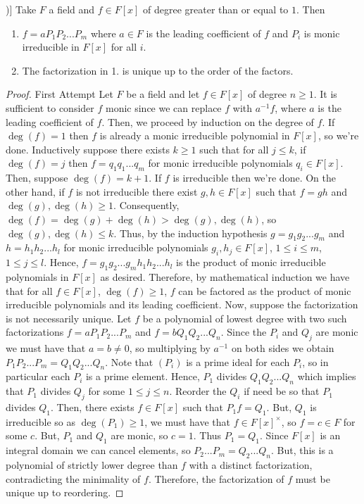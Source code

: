 \documentclass[12pt, a4paper, oneside, openright, titlepage]{book}
\begin{document}
\begin{namthm}[Unique Factorization Theorem (for F[x])]
    Take $F$ a field and $f \in F[x]$ of degree greater than or equal to $1$. Then \begin{enumerate}
        \item $f = aP_1P_2...P_m$ where $a \in F$ is the leading coefficient of $f$ and $P_i$ is monic irreducible in $F[x]$ for all $i$.
        \item The factorization in 1. is unique up to the order of the factors.
    \end{enumerate}
\end{namthm}
\begin{proof}{First Attempt}
    Let $F$ be a field and let $f \in F[x]$ of degree $n \geq 1$. It is sufficient to consider $f$ monic since we can replace $f$ with $a^{-1}f$, where $a$ is the leading coefficient of $f$. Then, we proceed by induction on the degree of $f$. If $\deg(f) = 1$ then $f$ is already a monic irreducible polynomial in $F[x]$, so we're done. Inductively suppose there exists $k \geq 1$ such that for all $j \leq k$, if $\deg(f) = j$ then $f = q_1q_1...q_m$ for monic irreducible polynomials $q_i \in F[x]$. Then, suppose $\deg(f) = k+1$. If $f$ is irreducible then we're done. On the other hand, if $f$ is not irreducible there exist $g,h \in F[x]$ such that $f = gh$ and $\deg(g),\deg(h) \geq 1$. Consequently, $\deg(f) = \deg(g)+\deg(h) > \deg(g),\deg(h)$, so $\deg(g),\deg(h) \leq k$. Thus, by the induction hypothesis $g = g_1g_2...g_m$ and $h = h_1h_2...h_l$ for monic irreducible polynomials $g_i,h_j \in F[x]$, $1\leq i \leq m$, $1 \leq j \leq l$. Hence, $f = g_1g_2...g_mh_1h_2...h_l$ is the product of monic irreducible polynomials in $F[x]$ as desired. Therefore, by mathematical induction we have that for all $f \in F[x]$, $\deg(f) \geq 1$, $f$ can be factored as the product of monic irreducible polynomials and its leading coefficient. Now, suppose the factorization is not necessarily unique. Let $f$ be a polynomial of lowest degree with two such factorizations $f = aP_1P_2...P_m$ and $f = bQ_1Q_2...Q_n$. Since the $P_i$ and $Q_j$ are monic we must have that $a = b \neq 0$, so multiplying by $a^{-1}$ on both sides we obtain $P_1P_2...P_m = Q_1Q_2...Q_n$. Note that $(P_i)$ is a prime ideal for each $P_i$, so in particular each $P_i$ is a prime element. Hence, $P_1$ divides $Q_1Q_2...Q_n$ which implies that $P_1$ divides $Q_j$ for some $1 \leq j \leq n$. Reorder the $Q_i$ if need be so that $P_1$ divides $Q_1$. Then, there exists $f \in F[x]$ such that $P_1f = Q_1$. But, $Q_1$ is irreducible so as $\deg(P_1) \geq 1$, we must have that $f \in F[x]^{\times}$, so $f = c \in F$ for some $c$. But, $P_1$ and $Q_1$ are monic, so $c = 1$. Thus $P_1 = Q_1$. Since $F[x]$ is an integral domain we can cancel elements, so $P_2...P_m = Q_2...Q_n$. But, this is a polynomial of strictly lower degree than $f$ with a distinct factorization, contradicting the minimality of $f$. Therefore, the factorization of $f$ must be unique up to reordering.
\end{proof}
\end{document}
